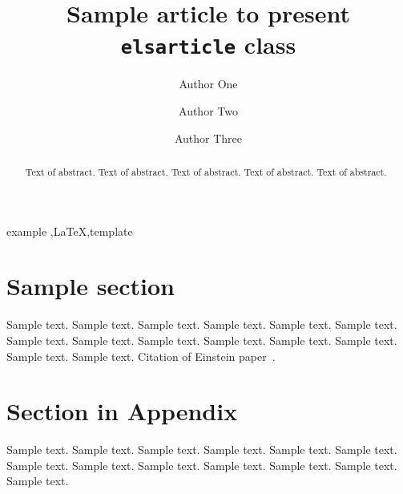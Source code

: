 \documentclass[final,1p,times,twocolumn]{elsarticle}
\begin{document}
\begin{frontmatter}

\title{Sample article to present \texttt{elsarticle} class}


\author[label1,label2]{Author One}
\address[label1]{Address One}
\address[label2]{Address Two}



\author[label5]{Author Two}
\address[label5]{Some University}

\author[label1,label5]{Author Three}

\begin{abstract}
Text of abstract. Text of abstract. Text of abstract. Text of abstract. Text of abstract. 
\end{abstract}

\begin{keyword}
example \sep \LaTeX \sep template
\end{keyword}

\end{frontmatter}

\section{Sample section}
\label{sec1}

Sample text. Sample text. Sample text. Sample text. Sample text. Sample text. 
Sample text. Sample text. Sample text. Sample text. Sample text. Sample text. 
Sample text. Sample text. Citation of Einstein paper~\cite{Einstein}.
\


\appendix

\section{Section in Appendix}
\label{appendix-sec1}

Sample text. Sample text. Sample text. Sample text. Sample text. Sample text. 
Sample text. Sample text. Sample text. Sample text. Sample text. Sample text. 
Sample text. 





\end{document}
